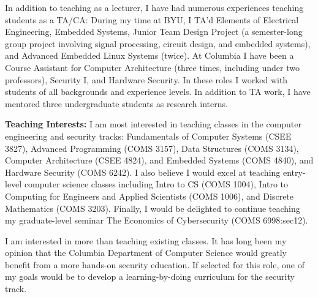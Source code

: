 \documentclass[11pt]{amsart}
\begin{document}
In addition to teaching as a lecturer, I have had numerous experiences teaching students as a TA/CA:
During my time at BYU, I TA'd 
Elements of Electrical Engineering, Embedded Systems, Junior Team Design Project (a semester-long group project involving signal processing, circuit design, and embedded systems), and Advanced Embedded Linux Systems (twice).
At Columbia I have been a Course Assistant for Computer Architecture (three times, including under two professors), Security I, and Hardware Security.
In these roles I worked with students of all backgrounds and experience levels. 
In addition to TA work, I have mentored three undergraduate students as research interns. 


\textbf{Teaching Interests:}
I am most interested in teaching classes in the computer engineering and security tracks: Fundamentals of Computer Systems (CSEE 3827), Advanced Programming (COMS 3157), Data Structures (COMS 3134), Computer Architecture (CSEE 4824), and Embedded Systems (COMS 4840), and Hardware Security (COMS 6242). I also believe I would excel at teaching entry-level computer science classes including Intro to CS (COMS 1004), Intro to Computing for Engineers and Applied Scientists (COMS 1006), and Discrete Mathematics (COMS 3203). 
Finally, I would be delighted to continue teaching my graduate-level seminar The Economics of Cybersecurity (COMS 6998:sec12). 


I am interested in more than teaching existing classes. 
It has long been my opinion that the Columbia Department of Computer Science would greatly benefit from a more hands-on security education. 
If selected for this role, one of my goals would be to develop a learning-by-doing curriculum for the security track. 

\end{document}
